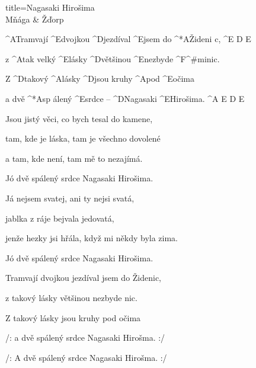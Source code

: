 \begin{song}{title=\predtitle\centering Nagasaki Hirošima \\\large Mňága \&  Žďorp  \vspace*{-0.3cm}}  %
\begin{centerjustified}
\nejnejvetsi

\sloka
	^{A\z }Tramvají ^{E\z }dvojkou ^{D\z }jezdíval ^{E}jsem do ^*{\z A}Žideni c, ^{E\,\,D\,\,E}

	z ^{A}tak velký ^{E\z }lásky ^{D\z}většinou ^{E\z }nezbyde ^{F^{\#}mi\z }nic.~~~

	Z ^{D\z }takový ^{A\z}lásky ^{D\z}jsou kruhy ^{A\z}pod ^{\z E}očima

	a dvě ^*{A}sp álený ^{E\z }srdce -- ^{D\z }Nagasaki ^{E\z}Hirošima. ^{A\,\,E\,\,D\,\,E}

\sloka
	Jsou jistý věci, co bych tesal do kamene,
	
	tam, kde je láska, tam je všechno dovolené
	
	a tam, kde není, tam mě to nezajímá.
	
	Jó dvě spálený srdce Nagasaki Hirošima.

\sloka
	Já nejsem svatej, ani ty nejsi svatá,
	
	jablka z ráje bejvala jedovatá,
	
	jenže hezky jsi hřála, když mi někdy byla zima.
	
	Jó dvě spálený srdce Nagasaki Hirošima.

\sloka
	Tramvají dvojkou jezdíval jsem do Židenic,
	
	z takový lásky většinou nezbyde nic.
	
	Z takový lásky jsou kruhy pod očima

	/: a dvě spálený srdce Nagasaki Hirošma. :/
	
	/: A dvě spálený srdce Nagasaki Hirošma. :/

\end{centerjustified}

\centering
{}

\setcounter{Slokočet}{0}
\end{song}
